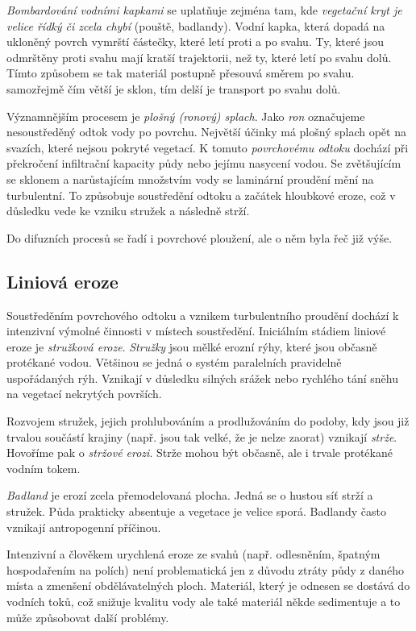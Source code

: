 \emph{Bombardování vodními kapkami} se uplatňuje zejména tam, kde \emph{vegetační kryt je velice řídký či zcela chybí} (pouště, badlandy). Vodní kapka, která dopadá na ukloněný povrch vymrští částečky, které letí proti a po svahu. Ty, které jsou odmrštěny proti svahu mají kratší trajektorii, než ty, které letí po svahu dolů. Tímto způsobem se tak materiál postupně přesouvá směrem po svahu. samozřejmě čím větší je sklon, tím delší je transport po svahu dolů.

Významnějším procesem je \emph{plošný (ronový) splach}. Jako \emph{ron} označujeme nesoustředěný odtok vody po povrchu. Největší účinky má plošný splach opět na svazích, které nejsou pokryté vegetací. K tomuto \emph{povrchovému odtoku} dochází při překročení infiltrační kapacity půdy nebo jejímu nasycení vodou. Se zvětšujícím se sklonem a narůstajícím množstvím vody se laminární proudění mění na turbulentní. To způsobuje soustředění odtoku a začátek hloubkové eroze, což v důsledku vede ke vzniku stružek a následně strží.

Do difuzních procesů se řadí i povrchové ploužení, ale o něm byla řeč již výše.

\subsection{Liniová eroze}
Soustředěním povrchového odtoku a vznikem turbulentního proudění dochází k intenzivní výmolné činnosti v místech soustředění. Iniciálním stádiem liniové eroze je \emph{stružková eroze}. \emph{Stružky} jsou mělké erozní rýhy, které jsou občasně protékané vodou. Většinou se jedná o systém paralelních pravidelně uspořádaných rýh. Vznikají v důsledku silných srážek nebo rychlého tání sněhu na vegetací nekrytých površích. 

Rozvojem stružek, jejich prohlubováním a prodlužováním do podoby, kdy jsou již trvalou součástí krajiny (např. jsou tak velké, že je nelze zaorat) vznikají \emph{strže}. Hovoříme pak o \emph{stržové erozi}. Strže mohou být občasně, ale i trvale protékané vodním tokem. 

\emph{Badland} je erozí zcela přemodelovaná plocha. Jedná se o hustou síť strží a stružek. Půda prakticky absentuje a vegetace je velice sporá. Badlandy často vznikají antropogenní příčinou. 

Intenzivní a člověkem urychlená eroze ze svahů (např. odlesněním, špatným hospodařením na polích) není problematická jen z důvodu ztráty půdy z daného místa a zmenšení obdělávatelných ploch. Materiál, který je odnesen se dostává do vodních toků, což snižuje kvalitu vody ale také materiál někde sedimentuje a to může způsobovat další problémy. 

